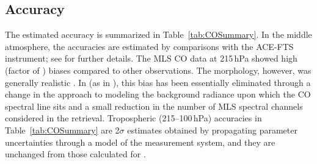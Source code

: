 \subsection{Accuracy}
The estimated accuracy is summarized in Table~\ref{tab:COSummary}. In the middle atmosphere, the accuracies are estimated by comparisons with the ACE-FTS instrument; see \citet{PumphreyEtal:2007} for further details. The MLS \vii CO data at 215\,hPa showed high (factor of ) biases compared to other observations. The morphology, however, was generally realistic \citep{LiveseyEtal:2008}. In \thisv (as in \prevv), this bias has been essentially eliminated through a change in the approach to modeling the background radiance upon which the CO spectral line sits and a small reduction in the number of MLS spectral channels considered in the retrieval. Tropospheric (215--100\,hPa) accuracies in Table~\ref{tab:COSummary} are 2$\sigma$ estimates obtained by propagating parameter uncertainties through a model of the measurement system, and they are unchanged from those calculated for \prevv.

